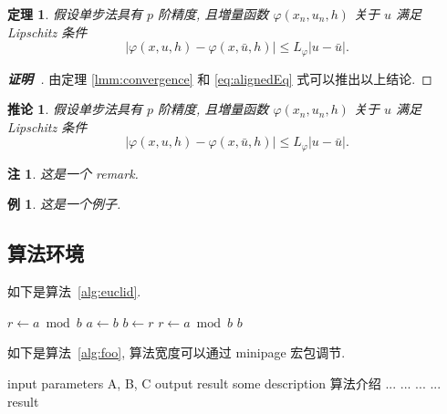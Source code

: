 \documentclass[zihao=-4]{ctexart}
\numberwithin{equation}{section}
\numberwithin{figure}{section}
\numberwithin{table}{section}
\theoremstyle{plain}
\newtheorem{theorem}{定理}[section]
\newtheorem{example}{例}
\newtheorem{corollary}{推论}[section]
\newtheorem{remark}{注}[section]
\begin{document}
\begin{theorem}\label{thm:convergence}
假设单步法具有 $p$ 阶精度, 且増量函数 $\varphi(x_{n}, u_{n}, h)$ 关于 $u$ 满足\textup{Lipschitz} 条件
\begin{equation}\label{eq:conver2}
|\varphi(x, u, h)-\varphi(x, \bar{u}, h)| \leqslant L_{\varphi}|u-\bar{u}|.
\end{equation}
\end{theorem}
\begin{proof}[\normalfont\bfseries 证明~\nopunct]
由定理 \ref{lmm:convergence} 和 \eqref{eq:alignedEq} 式可以推出以上结论.
\end{proof}

\begin{corollary}\label{col:convergence}
假设单步法具有 $p$ 阶精度, 且増量函数 $\varphi(x_{n}, u_{n}, h)$ 关于 $u$ 满足 \textup{Lipschitz} 条件
\begin{equation}\label{eq:conver3}
|\varphi(x, u, h)-\varphi(x, \bar{u}, h)| \leqslant L_{\varphi}|u-\bar{u}|.
\end{equation}
\end{corollary}

\begin{remark}\label{rem:remark}
这是一个 remark.
\end{remark}

\begin{example}
这是一个例子.
\end{example}


\clearpage
\subsection{算法环境}

如下是算法~\ref{alg:euclid}.
\begin{algorithm}[H]
\small
\caption{~Euclid's algorithm}\label{alg:euclid}
\begin{algorithmic}[1]
  \State $r\gets a\bmod b$
  \State $a\gets b$
  \State $b\gets r$
  \State $r\gets a\bmod b$
  \EndWhile\label{euclidendwhile}
  \State \Return $b$
  \EndProcedure
\end{algorithmic}
\end{algorithm}

如下是算法~\ref{alg:foo}, 算法宽度可以通过 minipage 宏包调节.

\begin{center}
\vspace{-2ex}
\begin{minipage}{.9\linewidth}
\begin{algorithm}[H]
\caption{~算法的名字}\label{alg:foo}
\begin{algorithmic}[1]
\Require input parameters A, B, C
\Ensure output result
\State some description 算法介绍
  \State ...
    \State ...
    \Else
    \State ...
  \EndIf
\EndFor
{}
  \State ...
\EndWhile
\State \Return result
\end{algorithmic}
\end{algorithm}
\end{minipage}
\end{center}
\end{document}
